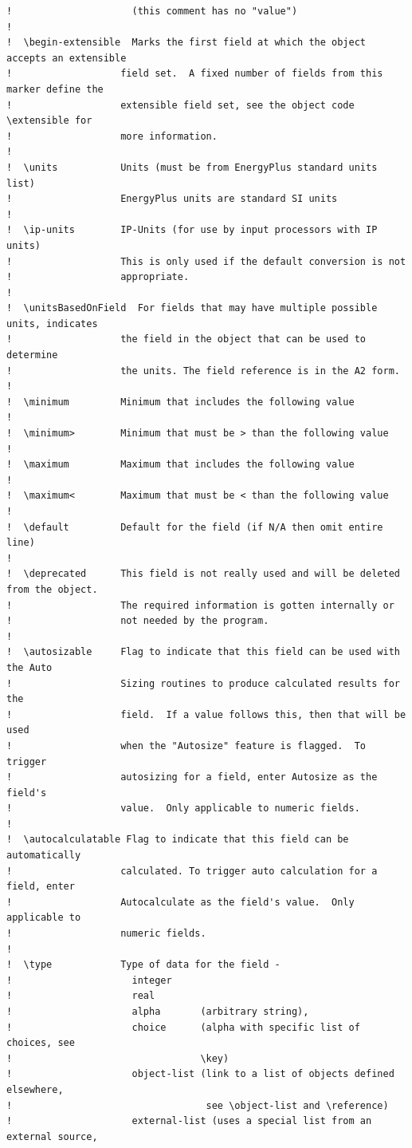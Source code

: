 \begin{lstlisting}
!                     (this comment has no "value")
!
!  \begin-extensible  Marks the first field at which the object accepts an extensible
!                   field set.  A fixed number of fields from this marker define the
!                   extensible field set, see the object code \extensible for
!                   more information.
!
!  \units           Units (must be from EnergyPlus standard units list)
!                   EnergyPlus units are standard SI units
!
!  \ip-units        IP-Units (for use by input processors with IP units)
!                   This is only used if the default conversion is not
!                   appropriate.
!
!  \unitsBasedOnField  For fields that may have multiple possible units, indicates
!                   the field in the object that can be used to determine
!                   the units. The field reference is in the A2 form.
!
!  \minimum         Minimum that includes the following value
!
!  \minimum>        Minimum that must be > than the following value
!
!  \maximum         Maximum that includes the following value
!
!  \maximum<        Maximum that must be < than the following value
!
!  \default         Default for the field (if N/A then omit entire line)
!
!  \deprecated      This field is not really used and will be deleted from the object.
!                   The required information is gotten internally or
!                   not needed by the program.
!
!  \autosizable     Flag to indicate that this field can be used with the Auto
!                   Sizing routines to produce calculated results for the
!                   field.  If a value follows this, then that will be used
!                   when the "Autosize" feature is flagged.  To trigger
!                   autosizing for a field, enter Autosize as the field's
!                   value.  Only applicable to numeric fields.
!
!  \autocalculatable Flag to indicate that this field can be automatically
!                   calculated. To trigger auto calculation for a field, enter
!                   Autocalculate as the field's value.  Only applicable to
!                   numeric fields.
!
!  \type            Type of data for the field -
!                     integer
!                     real
!                     alpha       (arbitrary string),
!                     choice      (alpha with specific list of choices, see
!                                 \key)
!                     object-list (link to a list of objects defined elsewhere,
!                                  see \object-list and \reference)
!                     external-list (uses a special list from an external source,

\end{lstlisting}

